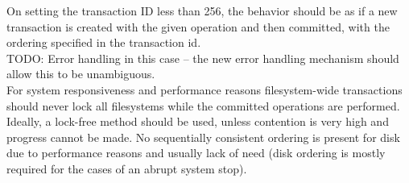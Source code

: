 On setting the transaction ID less than 256, the behavior should be as if a new transaction is created with the given operation and then committed, with the ordering specified in the transaction id.\\
TODO: Error handling in this case -- the new error handling mechanism should allow this to be unambiguous.\\
For system responsiveness and performance reasons filesystem-wide transactions should never lock all filesystems while the committed operations are performed. Ideally, a lock-free method should be used, unless contention is very high and progress cannot be made.
No sequentially consistent ordering is present for disk due to performance reasons and usually lack of need (disk ordering is mostly required for the cases of an abrupt system stop).